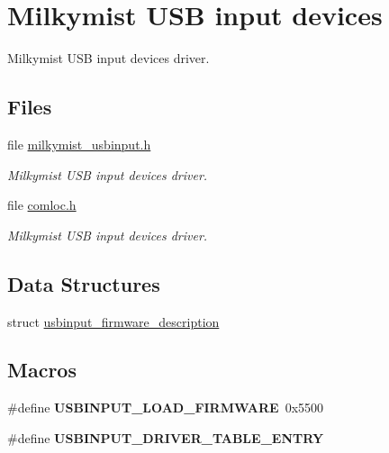 \hypertarget{group__lm32__milkymist__usbinput}{}\section{Milkymist U\+SB input devices}
\label{group__lm32__milkymist__usbinput}


Milkymist U\+SB input devices driver.  


\subsection*{Files}
\begin{DoxyCompactItemize}
\item 
file \mbox{\hyperlink{milkymist__usbinput_8h}{milkymist\+\_\+usbinput.\+h}}
\begin{DoxyCompactList}\small\item\em Milkymist U\+SB input devices driver. \end{DoxyCompactList}\item 
file \mbox{\hyperlink{comloc_8h}{comloc.\+h}}
\begin{DoxyCompactList}\small\item\em Milkymist U\+SB input devices driver. \end{DoxyCompactList}\end{DoxyCompactItemize}
\subsection*{Data Structures}
\begin{DoxyCompactItemize}
\item 
struct \mbox{\hyperlink{structusbinput__firmware__description}{usbinput\+\_\+firmware\+\_\+description}}
\end{DoxyCompactItemize}
\subsection*{Macros}
\begin{DoxyCompactItemize}
\item 
\mbox{\label{group__lm32__milkymist__usbinput_ga82a827a370bc86791df1428de6246ce2}} 
\#define {\bfseries U\+S\+B\+I\+N\+P\+U\+T\+\_\+\+L\+O\+A\+D\+\_\+\+F\+I\+R\+M\+W\+A\+RE}~0x5500
\item 
\#define {\bfseries U\+S\+B\+I\+N\+P\+U\+T\+\_\+\+D\+R\+I\+V\+E\+R\+\_\+\+T\+A\+B\+L\+E\+\_\+\+E\+N\+T\+RY}
\end{DoxyCompactItemize}
